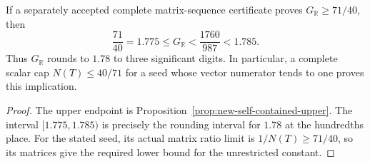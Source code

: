 \begin{proposition}
\label{prop:new-three-significant-digit-implication}
If a separately accepted complete matrix-sequence certificate proves
$G_{\mathbb R}\geq71/40$, then
\[
 \frac{71}{40}=1.775\leq G_{\mathbb R}
                         <\frac{1760}{987}<1.785.
\]
Thus $G_{\mathbb R}$ rounds to $1.78$ to three significant digits.
In particular, a complete scalar cap $N(T)\leq40/71$ for a seed
whose vector numerator tends to one proves this implication.
\end{proposition}
\begin{proof}
The upper endpoint is Proposition~\ref{prop:new-self-contained-upper}.
The interval $[1.775,1.785)$ is precisely the rounding interval for
$1.78$ at the hundredths place.  For the stated seed, its actual
matrix ratio limit is $1/N(T)\geq71/40$, so its matrices give the
required lower bound for the unrestricted constant.
\end{proof}
